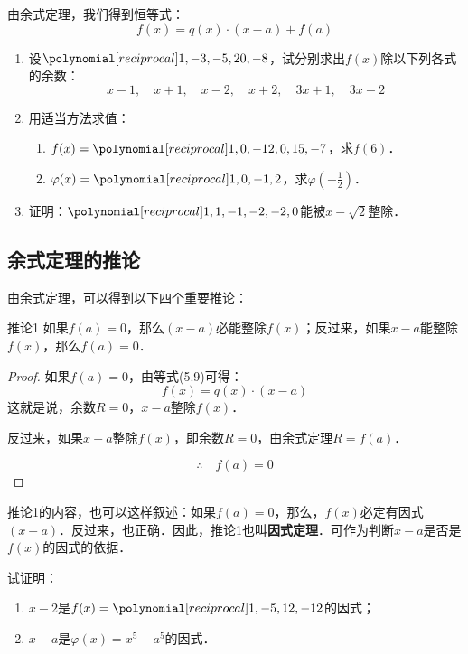 由余式定理，我们得到恒等式：
\begin{equation}
    f(x)=q(x)\cdot (x-a)+f(a)
\end{equation}

\begin{ex}
\begin{enumerate}
    \item 设$\poly{1,-3,-5,20,-8}$，试分别求出$f(x)$除以下列各式的余数：
    \[x-1,\quad x+1,\quad x-2,\quad x+2,\quad 3x+1,\quad 3x-2 \]
    \item 用适当方法求值：
    \begin{enumerate}
        \item $f(x)=\poly{1,0,-12,0,15,-7}$，求$f(6)$．
        \item $\varphi(x)=\poly{1,0,-1,2}$，求$\varphi\left(-\frac{1}{2}\right)$．
    \end{enumerate}
    \item 证明：$\poly{1,1,-1,-2,-2,0}$能被$x-\sqrt{2}$整除．
\end{enumerate}
\end{ex}

\subsection{余式定理的推论}
由余式定理，可以得到以下四个重要推论：
\begin{blk}{推论1}
    如果$f(a)=0$，那么$(x-a)$必能整除$f(x)$；反过来，如果$x-a$能整除$f(x)$，那么$f(a)=0$．
\end{blk}

\begin{proof}
    如果$f(a)=0$，由等式(5.9)可得：
    \[f(x)=q(x) \cdot (x-a)\]    
    这就是说，余数$R=0$，$x-a$整除$f(x)$．
    
    反过来，如果$x-a$整除$f(x)$，即余数$R=0$，由余式定理$R=f(a)$．
    
$$\therefore\quad f (a) =0$$
\end{proof}

推论1的内容，也可以这样叙述：如果$f(a)=0$，那么，$f(x)$必定有因式$(x-a)$．反过来，也正确．因此，推论1也叫\textbf{因式定理}．可作为判断$x-a$是否是$f(x)$的因式的依据．

\begin{example}
    试证明：
\begin{enumerate}
    \item $x-2$是$f(x)=\poly{1,-5,12,-12}$的因式；
    \item $x-a$是$\varphi(x)=x^5-a^5$的因式．
\end{enumerate}
\end{example}

